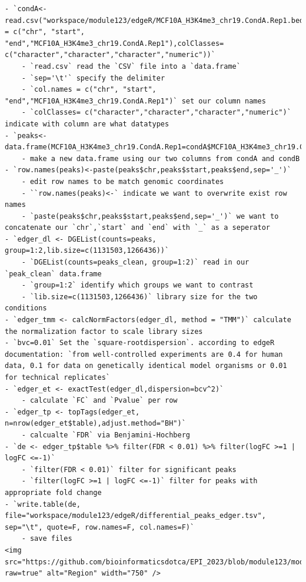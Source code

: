 \documentclass[
]{book}
\begin{document}
\begin{verbatim}
- `condA<-read.csv("workspace/module123/edgeR/MCF10A_H3K4me3_chr19.CondA.Rep1.bed",sep='\t',col.names = c("chr", "start", "end","MCF10A_H3K4me3_chr19.CondA.Rep1"),colClasses= c("character","character","character","numeric"))`
    - `read.csv` read the `CSV` file into a `data.frame`
    - `sep='\t'` specify the delimiter
    - `col.names = c("chr", "start", "end","MCF10A_H3K4me3_chr19.CondA.Rep1")` set our column names
    - `colClasses= c("character","character","character","numeric")` indicate with column are what datatypes
- `peaks<-data.frame(MCF10A_H3K4me3_chr19.CondA.Rep1=condA$MCF10A_H3K4me3_chr19.CondA.Rep1,MCF10A_H3K4me3_chr19.CondB.Rep1=condB$MCF10A_H3K4me3_chr19.CondB.Rep1)`
    - make a new data.frame using our two columns from condA and condB
- `row.names(peaks)<-paste(peaks$chr,peaks$start,peaks$end,sep='_')`
    - edit row names to be match genomic coordinates
    - ``row.names(peaks)<-` indicate we want to overwrite exist row names
    - `paste(peaks$chr,peaks$start,peaks$end,sep='_')` we want to concatenate our `chr`,`start` and `end` with `_` as a seperator
- `edger_dl <- DGEList(counts=peaks, group=1:2,lib.size=c(1131503,1266436))`
    - `DGEList(counts=peaks_clean, group=1:2)` read in our `peak_clean` data.frame
    - `group=1:2` identify which groups we want to contrast
    - `lib.size=c(1131503,1266436)` library size for the two conditions
- `edger_tmm <- calcNormFactors(edger_dl, method = "TMM")` calculate the normalization factor to scale library sizes
- `bvc=0.01` Set the `square-rootdispersion`. according to edgeR documentation: `from well-controlled experiments are 0.4 for human data, 0.1 for data on genetically identical model organisms or 0.01 for technical replicates`
- `edger_et <- exactTest(edger_dl,dispersion=bcv^2)`
    - calculate `FC` and `Pvalue` per row
- `edger_tp <- topTags(edger_et, n=nrow(edger_et$table),adjust.method="BH")`
    - calcualte `FDR` via Benjamini-Hochberg
- `de <- edger_tp$table %>% filter(FDR < 0.01) %>% filter(logFC >=1 | logFC <=-1)`
    - `filter(FDR < 0.01)` filter for significant peaks
    - `filter(logFC >=1 | logFC <=-1)` filter for peaks with appropriate fold change
- `write.table(de, file="workspace/module123/edgeR/differential_peaks_edger.tsv", sep="\t", quote=F, row.names=F, col.names=F)`
    - save files
<img src="https://github.com/bioinformaticsdotca/EPI_2023/blob/module123/module123_images/edger.png?raw=true" alt="Region" width="750" />
\end{verbatim}
\end{document}
